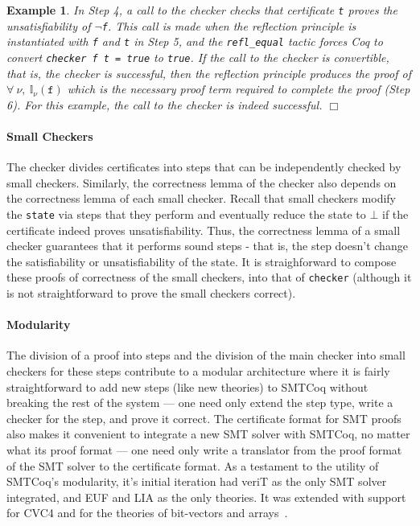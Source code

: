 \documentclass[11pt]{article}
\newtheorem{example}{Example}[section]
\newcommand{\intr}[1]{\mathbb{I}_{\nu}(#1)}
\begin{document}
\begin{example}
		In Step 4, a call to the checker 
		checks that certificate \texttt{t} 
		proves the unsatisfiability of 
		\texttt{$\neg$f}. This call is made
		when the reflection principle 
		is instantiated with \texttt{f} and 
		\texttt{t} in Step 5, and the 
		\texttt{refl\_equal} tactic forces 
		Coq to convert 
		\texttt{checker f t = true} to 
		\texttt{true}. If the call to the 
		checker is convertible, that is,
		the checker is successful, then 
		the reflection principle produces 
		the proof of 
		$\forall\ \nu,\ \intr{\texttt{f}}$
		which is the necessary proof term 
		required to complete the proof 
		(Step 6). For 
		this example, the call to the 
		checker is indeed successful.
		\hfill $\Box$
	\end{example}

	\paragraph{Small Checkers}
	The checker divides certificates
	into steps that can be independently 
	checked by small checkers.
	Similarly, the correctness lemma
	of the checker also depends on 
	the correctness lemma of each 
	small checker. Recall that 
	small checkers modify the 
	\texttt{state} via steps that 
	they perform and eventually
	reduce the state to $\bot$ if 
	the certificate indeed proves
	unsatisfiability.  Thus, the 
	correctness lemma of a small 
	checker guarantees that it
	performs sound steps - that is,
	the step doesn't change the 
	satisfiability or unsatisfiability
	of the state. It is straighforward
	to compose these proofs 
	of correctness of the small 
	checkers, into that of
	\texttt{checker} (although
	it is not straightforward 
	to prove the small checkers 
	correct). 
	
	\paragraph{Modularity} The division 
	of a proof into steps and 
	the division of the main 
	checker into small checkers for these
	steps contribute to a 
	modular architecture where it 
	is fairly straightforward to 
	add new steps (like new theories)
	to SMTCoq without breaking 
	the rest of the system --- one 
	need only extend the step type,
	write a checker for the step, 
	and prove it correct. The 
	certificate format for SMT
	proofs also makes it 
	convenient to integrate a 
	new SMT solver with SMTCoq, 
	no matter what its proof format
	--- one need only write a translator
	from the proof format of the SMT
	solver to the certificate format. 
	As a testament to the utility of
	SMTCoq's modularity, it's 
	initial iteration had veriT as 
	the only SMT solver integrated, 
	and EUF and LIA as the only 
	theories. It was extended 
	with support for CVC4 and 
	for the theories of 
	bit-vectors and 
	arrays~\cite{DBLP:journals/corr/EkiciKKMRT16}.
	
\end{document}
